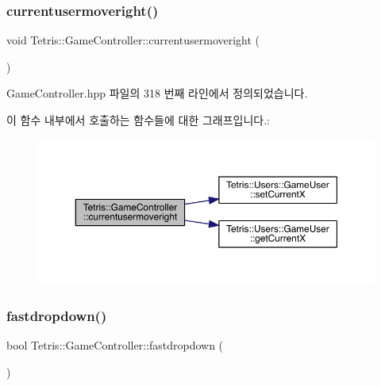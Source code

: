 \subsubsection{\texorpdfstring{currentusermoveright()}{currentusermoveright()}\hspace{0.1cm}{\footnotesize\ttfamily [2/2]}}
{\footnotesize\ttfamily void Tetris\+::\+Game\+Controller\+::currentusermoveright (\begin{DoxyParamCaption}{ }\end{DoxyParamCaption})\hspace{0.3cm}{\ttfamily [inline]}}



Game\+Controller.\+hpp 파일의 318 번째 라인에서 정의되었습니다.

이 함수 내부에서 호출하는 함수들에 대한 그래프입니다.\+:
\nopagebreak
\begin{figure}[H]
\begin{center}
\leavevmode
\includegraphics[width=350pt]{class_tetris_1_1_game_controller_a1d2859507cbc9bf9789753228cdedc1f_cgraph}
\end{center}
\end{figure}
\mbox{\label{class_tetris_1_1_game_controller_a8d5b65ec7638519a39b4ba8a71e67fff}} 
\subsubsection{\texorpdfstring{fastdropdown()}{fastdropdown()}\hspace{0.1cm}{\footnotesize\ttfamily [1/2]}}
{\footnotesize\ttfamily bool Tetris\+::\+Game\+Controller\+::fastdropdown (\begin{DoxyParamCaption}{ }\end{DoxyParamCaption})}



